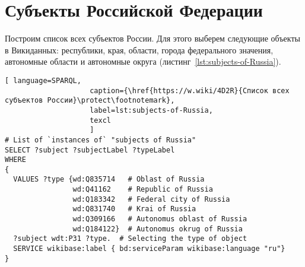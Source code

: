 \section{Субъекты Российской Федерации}

Построим список всех субъектов России. Для этого выберем следующие объекты в Викиданных: республики, края, области, города федерального значения, автономные области и автономные округа (листинг~\protect\ref{lst:subjects-of-Russia}).


\begin{lstlisting}[ language=SPARQL, 
                    caption={\href{https://w.wiki/4D2R}{Список всех субъектов России}\protect\footnotemark},
                    label=lst:subjects-of-Russia,
                    texcl 
                    ]
# List of `instances of` "subjects of Russia" 
SELECT ?subject ?subjectLabel ?typeLabel
WHERE
{  
  VALUES ?type {wd:Q835714   # Oblast of Russia
                wd:Q41162    # Republic of Russia
                wd:Q183342   # Federal city of Russia
                wd:Q831740   # Krai of Russia
                wd:Q309166   # Autonomus oblast of Russia
                wd:Q184122}  # Autonomus okrug of Russia
  ?subject wdt:P31 ?type.  # Selecting the type of object
  SERVICE wikibase:label { bd:serviceParam wikibase:language "ru"}
}
\end{lstlisting}%

